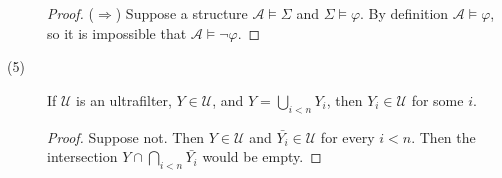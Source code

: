 \documentclass[12pt]{article}
\begin{document}
\begin{description}
\begin{proof}
  ($\Rightarrow$) Suppose a structure $\mathcal{A} \models \Sigma$ and
  $\Sigma \models \varphi$.  By definition $\mathcal{A} \models
  \varphi$, so it is impossible that $\mathcal{A} \models \neg\varphi$.
  \end{proof}

\item[(5)] If $\mathcal{U}$ is an ultrafilter, $Y \in \mathcal{U}$, and
$Y = \bigcup\limits_{i < n}{Y_i}$, then $Y_i \in \mathcal{U}$ for some $i$.
  \begin{proof}
  Suppose not.  Then $Y \in \mathcal{U}$ and $\bar{Y_i} \in \mathcal{U}$
  for every $i < n$.  Then the intersection $Y \cap \bigcap\limits_{i <
  n}{\bar{Y_i}}$ would be empty.
  \end{proof}
\end{description}
\end{document}
